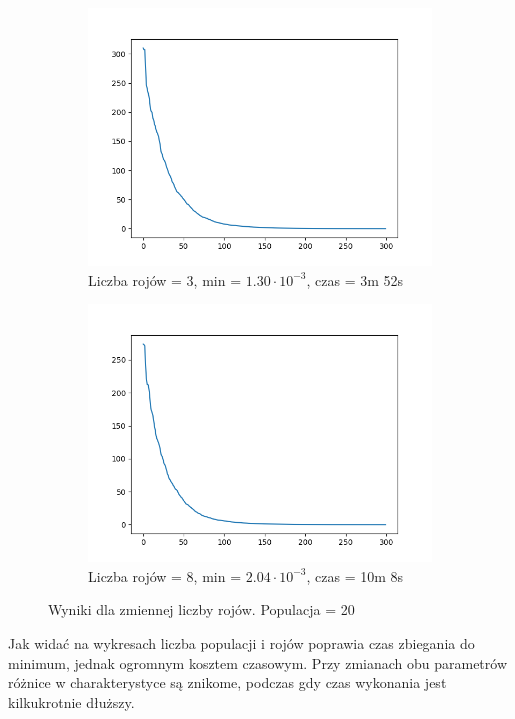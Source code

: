\documentclass[12pt]{article}
\begin{document}
\begin{figure}[H]
    \centering
    \begin{subfigure}{0.49\textwidth}
        \centering
        \includegraphics[width=\linewidth]{plots/MSPSO/3_best.png}
        \caption{Liczba rojów = 3, min = $1.30\cdot 10^{-3}$, czas = 3m 52s}
    \end{subfigure}
    \begin{subfigure}{0.49\textwidth}
        \centering
        \includegraphics[width=\linewidth]{plots/MSPSO/4_best.png}
        \caption{Liczba rojów = 8, min = $2.04\cdot 10^{-3}$, czas = 10m 8s}
    \end{subfigure}
    \caption{Wyniki dla zmiennej liczby rojów. Populacja = 20}
\end{figure}
Jak widać na wykresach liczba populacji i rojów poprawia czas zbiegania do minimum, jednak ogromnym kosztem czasowym. Przy zmianach obu parametrów różnice w charakterystyce są znikome, podczas gdy czas wykonania jest kilkukrotnie dłuższy.
\end{document}
